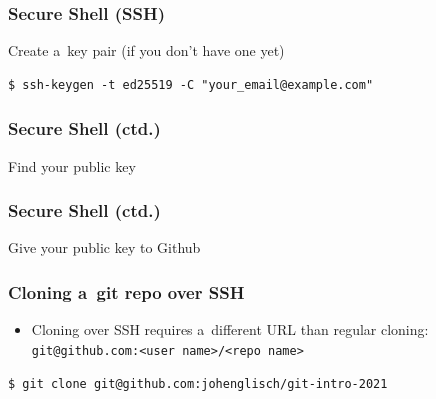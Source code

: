 \documentclass[12pt]{beamer}
\begin{document}
\begin{frame}[fragile]
  \frametitle{Secure Shell (SSH)}

  \begin{block}{Create a~key pair (if you don't have one yet)}
    {\footnotesize{}%
      \begin{verbatim}
$ ssh-keygen -t ed25519 -C "your_email@example.com"
      \end{verbatim}
    }
  \end{block}

\end{frame}

\begin{frame}
  \frametitle{Secure Shell (ctd.)}

  \begin{block}{Find your public key}
  \end{block}
\end{frame}

\begin{frame}
  \frametitle{Secure Shell (ctd.)}

  \begin{block}{Give your public key to Github}
  \end{block}
\end{frame}

\begin{frame}[fragile]
  \frametitle{Cloning a~git repo over SSH}

  \begin{itemize}
    \item Cloning over SSH requires a~different URL than regular cloning:\\
      {\footnotesize{}\verb"git@github.com:<user name>/<repo name>"}
  \end{itemize}
  {\footnotesize{}%
    \begin{verbatim}
$ git clone git@github.com:johenglisch/git-intro-2021
    \end{verbatim}%
  }
\end{frame}
\end{document}
